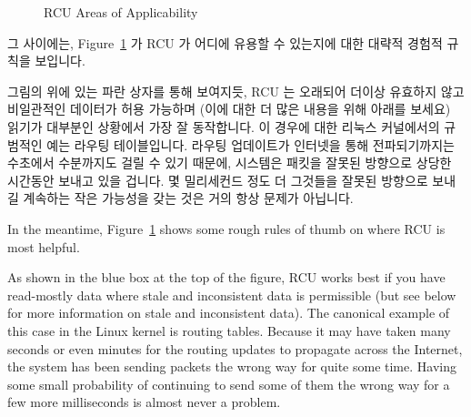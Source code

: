 \fi

\begin{figure}[tbh]
\centering
{}
\caption{RCU Areas of Applicability}
\label{fig:defer:RCU Areas of Applicability}
\end{figure}

그 사이에는,
Figure~\ref{fig:defer:RCU Areas of Applicability}
가 RCU 가 어디에 유용할 수 있는지에 대한 대략적 경험적 규칙을 보입니다.

그림의 위에 있는 파란 상자를 통해 보여지듯, RCU 는 오래되어 더이상 유효하지
않고 비일관적인 데이터가 허용 가능하며 (이에 대한 더 많은 내용을 위해 아래를
보세요) 읽기가 대부분인 상황에서 가장 잘 동작합니다.
이 경우에 대한 리눅스 커널에서의 규범적인 예는 라우팅 테이블입니다.
라우팅 업데이트가 인터넷을 통해 전파되기까지는 수초에서 수분까지도 걸릴 수 있기
때문에, 시스템은 패킷을 잘못된 방향으로 상당한 시간동안 보내고 있을 겁니다.
몇 밀리세컨드 정도 더 그것들을 잘못된 방향으로 보내길 계속하는 작은 가능성을
갖는 것은 거의 항상 문제가 아닙니다.

\iffalse

In the meantime,
Figure~\ref{fig:defer:RCU Areas of Applicability}
shows some rough rules of thumb on where RCU is most helpful.

As shown in the blue box at the top of the figure, RCU works best if
you have read-mostly data where stale and inconsistent
data is permissible (but see below for more information on stale and
inconsistent data).
The canonical example of this case in the Linux kernel is routing tables.
Because it may have taken many seconds or even minutes for the
routing updates to propagate across the Internet, the system
has been sending packets the wrong way for quite some time.
Having some small probability of continuing to send some of them the wrong
way for a few more milliseconds is almost never a problem.

